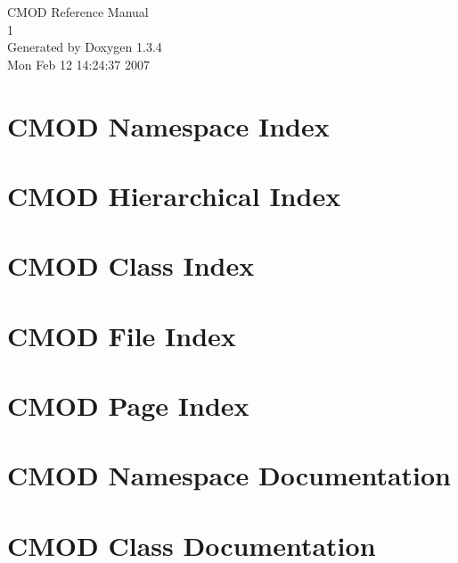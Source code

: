 \documentclass[a4paper]{book}
\begin{document}
\begin{titlepage}
\vspace*{7cm}
\begin{center}
{\Large CMOD Reference Manual\\[1ex]\large 1 }\\
\vspace*{1cm}
{\large Generated by Doxygen 1.3.4}\\
\vspace*{0.5cm}
{\small Mon Feb 12 14:24:37 2007}\\
\end{center}
\end{titlepage}
\clearemptydoublepage
{}
\tableofcontents
\clearemptydoublepage
{}
\chapter{CMOD Namespace Index}

\chapter{CMOD Hierarchical Index}

\chapter{CMOD Class Index}

\chapter{CMOD File Index}

\chapter{CMOD Page Index}

\chapter{CMOD Namespace Documentation}

\chapter{CMOD Class Documentation}

















\end{document}
